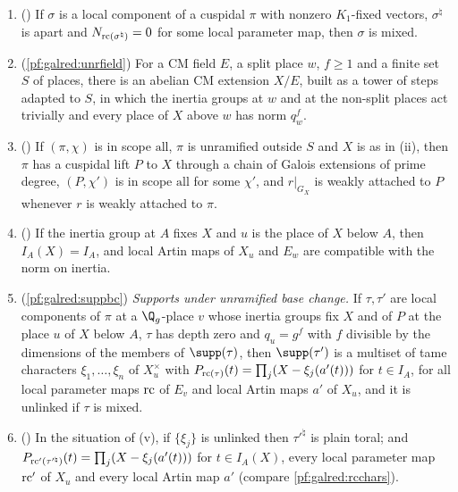 \begin{enumerate}[label=(\roman*),nosep]
\item () If $\sigma$ is a local component of a cuspidal $\pi$ with
  nonzero $K_1$-fixed vectors, $\sigma^\natural$ is apart and $N_{\mathrm{rc}(\sigma^\natural)}=0$ for some local parameter map,
  then $\sigma$ is mixed.
\item (\cref{pf:galred:unrfield}) For a CM field $E$, a split place $w$,
  $f\ge1$ and a finite set $S$ of places, there is an abelian CM extension $X/E$, built as a tower of steps adapted to
  $S$, in which the inertia groups at $w$ and at the non-split places act trivially and every place of $X$ above $w$
  has norm $q_w^f$.
\item () If $(\pi,\chi)$ is in scope $\mathrm{all}$, $\pi$ is unramified
  outside $S$ and $X$ is as in (ii), then $\pi$ has a cuspidal lift $P$ to $X$ through a chain of Galois extensions of
  prime degree, $(P,\chi')$ is in scope $\mathrm{all}$ for some $\chi'$, and $r|_{G_X}$ is weakly attached to $P$
  whenever $r$ is weakly attached to $\pi$.
\item () If the inertia group at $A$ fixes $X$ and $u$ is the place of $X$
  below $A$, then $I_A(X)=I_A$, and local Artin maps of $X_u$ and $E_w$ are compatible with the norm on inertia.
\item (\cref{pf:galred:suppbc}) \emph{Supports under unramified base change.} If $\tau,\tau'$ are local components of $\pi$
  at a $\Q_g$-place $v$ whose inertia groups fix $X$ and of $P$ at the place $u$ of $X$ below $A$, $\tau$ has depth zero
  and $q_u=g^f$ with $f$ divisible by the dimensions of the members of $\supp(\tau)$, then $\supp(\tau')$ is a multiset of
  tame characters $\xi_1,\dots,\xi_n$ of $X_u^\times$ with $P_{\mathrm{rc}(\tau)}(t)=\prod_j(X-\xi_j(a'(t)))$ for $t\in I_A$,
  for all local parameter maps $\mathrm{rc}$ of $E_v$ and local Artin maps $a'$ of $X_u$, and it is unlinked if $\tau$ is
  mixed.
\item () In the situation of (v), if $\{\xi_j\}$ is unlinked then
  $\tau'^\natural$ is plain toral; and $P_{\mathrm{rc}'(\tau'^\natural)}(t)=\prod_j(X-\xi_j(a'(t)))$ for $t\in I_A(X)$, every
  local parameter map $\mathrm{rc}'$ of $X_u$ and every local Artin map $a'$ (compare \cref{pf:galred:rcchars}).
\end{enumerate}

